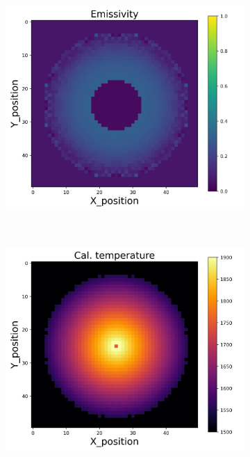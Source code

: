 \begin{figure}[htbp]
\begin{minipage}{\textwidth}
\begin{subfigure}{0.325\textwidth}
        \end{subfigure}
        \begin{subfigure}{0.325\textwidth}
            \centering
            \includegraphics[width=\textwidth]{figures/raw_data/21/lin_square/emi_cal.jpg}
        \end{subfigure}
    \end{minipage}\\
    \begin{minipage}{\textwidth}
        \centering
        \begin{subfigure}{0.325\textwidth}
            \centering
            \includegraphics[width=\textwidth]{figures/raw_data/5/lin_square/T_cal.jpg}

\end{subfigure}
\end{minipage}
\end{figure}
